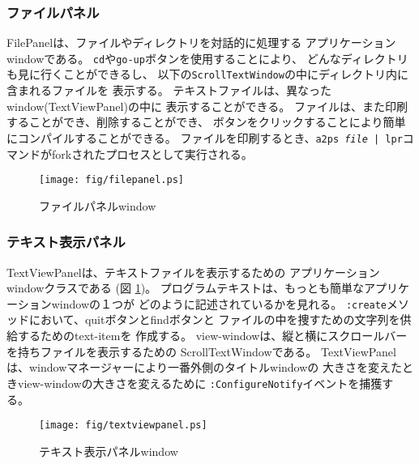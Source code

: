 \subsubsection{ファイルパネル}
FilePanelは、ファイルやディレクトリを対話的に処理する
アプリケーションwindowである。
{\tt cd}や{\tt go-up}ボタンを使用することにより、
どんなディレクトリも見に行くことができるし、
以下の{\tt ScrollTextWindow}の中にディレクトリ内に含まれるファイルを
表示する。
テキストファイルは、異なったwindow(TextViewPanel)の中に
表示することができる。
ファイルは、また印刷することができ、削除することができ、
ボタンをクリックすることにより簡単にコンパイルすることができる。
ファイルを印刷するとき、{\tt a2ps {\em file} | lpr}コマンドがforkされたプロセスとして実行される。

\begin{figure}
\begin{center}
\texttt{[image: fig/filepanel.ps]}
\end{center}
\caption{ファイルパネルwindow}
\end{figure}

\subsubsection{テキスト表示パネル}

TextViewPanelは、テキストファイルを表示するための
アプリケーションwindowクラスである
(図 \ref{textviewpanel})。
プログラムテキストは、もっとも簡単なアプリケーションwindowの１つが
どのように記述されているかを見れる。
{\tt :create}メソッドにおいて、quitボタンとfindボタンと
ファイルの中を捜すための文字列を供給するためのtext-itemを
作成する。
view-windowは、縦と横にスクロールバーを持ちファイルを表示するための
ScrollTextWindowである。
TextViewPanelは、windowマネージャーにより一番外側のタイトルwindowの
大きさを変えたときview-windowの大きさを変えるために
{\tt :ConfigureNotify}イベントを捕獲する。

\begin{figure}
\begin{center}
\texttt{[image: fig/textviewpanel.ps]}
\end{center}
\caption{テキスト表示パネルwindow\label{textviewpanel}}
\end{figure}

